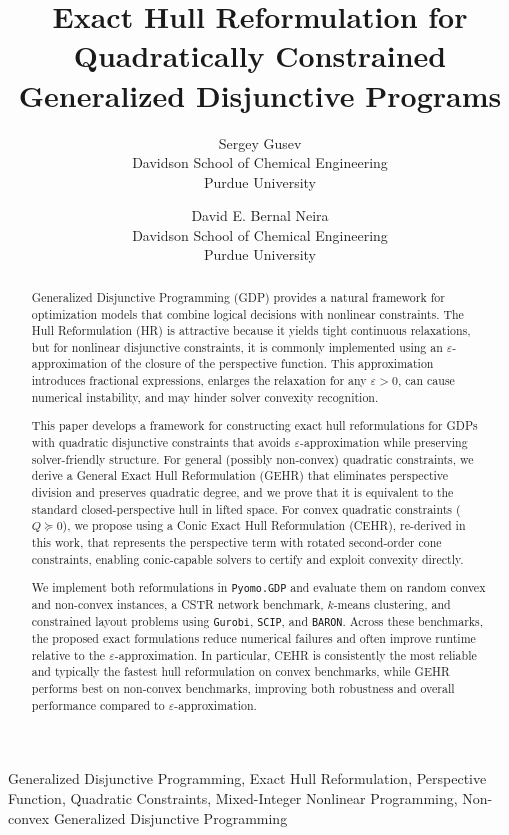 \documentclass[11pt]{article}
\title{Exact Hull Reformulation for Quadratically Constrained
Generalized Disjunctive Programs}
\author{
Sergey Gusev \\
Davidson School of Chemical Engineering \\
Purdue University
\and
David E. Bernal Neira \\
Davidson School of Chemical Engineering \\
Purdue University
}
\date{}
\begin{document}
\maketitle

\begin{abstract}
Generalized Disjunctive Programming (GDP) provides a natural framework for optimization models that combine logical decisions with nonlinear constraints.
The Hull Reformulation (HR) is attractive because it yields tight continuous relaxations, but for nonlinear disjunctive constraints, it is commonly implemented using an $\varepsilon$-approximation of the closure of the perspective function.
This approximation introduces fractional expressions, enlarges the relaxation for any $\varepsilon>0$, can cause numerical instability, and may hinder solver convexity recognition.

This paper develops a framework for constructing exact hull reformulations for GDPs with quadratic disjunctive constraints that avoids $\varepsilon$-approximation while preserving solver-friendly structure.
For general (possibly non-convex) quadratic constraints, we derive a General Exact Hull Reformulation (GEHR) that eliminates perspective division and preserves quadratic degree, and we prove that it is equivalent to the standard closed-perspective hull in lifted space.
For convex quadratic constraints ($Q\succeq 0$), we propose using a Conic Exact Hull Reformulation (CEHR), re-derived in this work, that represents the perspective term with rotated second-order cone constraints, enabling conic-capable solvers to certify and exploit convexity directly.

We implement both reformulations in \texttt{Pyomo.GDP} and evaluate them on random convex and non-convex instances, a CSTR network benchmark, $k$-means clustering, and constrained layout problems using \texttt{Gurobi}, \texttt{SCIP}, and \texttt{BARON}.
Across these benchmarks, the proposed exact formulations reduce numerical failures and often improve runtime relative to the $\varepsilon$-approximation.
In particular, CEHR is consistently the most reliable and typically the fastest hull reformulation on convex benchmarks, while GEHR performs best on non-convex benchmarks, improving both robustness and overall performance compared to  $\varepsilon$-approximation.
\end{abstract}

Generalized Disjunctive Programming,
Exact Hull Reformulation,
Perspective Function,
Quadratic Constraints,
Mixed-Integer Nonlinear Programming,
Non-convex Generalized Disjunctive Programming
\end{document}
